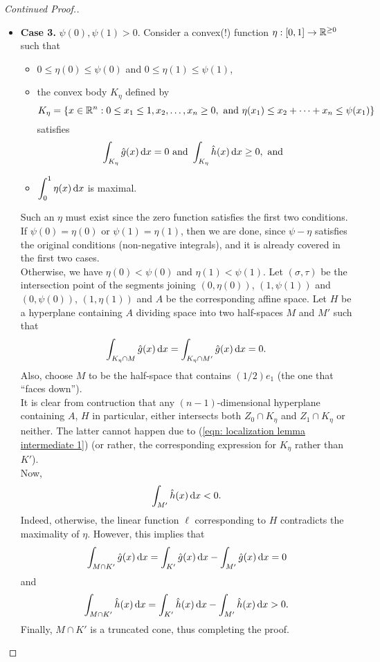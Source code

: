 \begin{proof}[Continued Proof.]
\begin{itemize}
		\item \textbf{Case 3.} $\psi(0),\psi(1)>0$.%
		Consider a convex(!) function $\eta:[0,1]\to\mathbb{R}^{\geq 0}$ such that
		\begin{itemize}
			\item $0\leq\eta(0)\leq\psi(0)$ and $0\leq\eta(1)\leq\psi(1)$,
			\item the convex body $K_\eta$ defined by
			\[ K_\eta = \{ x\in\mathbb{R}^n : 0\leq x_1\leq 1, x_2,\ldots,x_n\geq 0, \text{ and } \eta(x_1)\leq x_2+\cdots+x_n\leq\psi(x_1) \} \]
			satisfies
			\[ \int_{K_\eta} \hat{g}(x)\operatorname{d}\!{x} = 0 \text{ and } \int_{K_\eta} \hat{h}(x)\operatorname{d}\!{x}\geq 0, \text{ and } \]
			\item $\displaystyle\int_0^1 \eta(x)\operatorname{d}\!{x}$ is maximal.
		\end{itemize}
		Such an $\eta$ must exist since the zero function satisfies the first two conditions.\\
		If $\psi(0)=\eta(0)$ or $\psi(1)=\eta(1)$, then we are done, since $\psi-\eta$ satisfies the original conditions (non-negative integrals), and it is already covered in the first two cases.\\
		Otherwise, we have $\eta(0)<\psi(0)$ and $\eta(1)<\psi(1)$. Let $(\sigma,\tau)$ be the intersection point of the segments joining $(0,\eta(0))$, $(1,\psi(1))$ and $(0,\psi(0))$, $(1,\eta(1))$ and $A$ be the corresponding affine space. Let $H$ be a hyperplane containing $A$ dividing space into two half-spaces $M$ and $M'$ such that
		\[ \int_{K_\eta \cap M} \hat{g}(x)\operatorname{d}\!{x} = \int_{K_\eta \cap M'} \hat{g}(x)\operatorname{d}\!{x} = 0.  \]
		Also, choose $M$ to be the half-space that contains $(1/2) e_1$ (the one that ``faces down'').\\
		It is clear from contruction that any $(n-1)$-dimensional hyperplane containing $A$, $H$ in particular, either intersects both $Z_0\cap K_\eta$ and $Z_1\cap K_\eta$ or neither. The latter cannot happen due to (\ref{eqn: localization lemma intermediate 1}) (or rather, the corresponding expression for $K_\eta$ rather than $K'$).\\
		Now,
		\[ \int_{M'} \hat{h}(x)\operatorname{d}\!{x} < 0. \]
		Indeed, otherwise, the linear function $\ell$ corresponding to $H$ contradicts the maximality of $\eta$. However, this implies that
		\[ \int_{M\cap K'} \hat{g}(x)\operatorname{d}\!{x} = \int_{K'} \hat{g}(x)\operatorname{d}\!{x} - \int_{M'}\hat{g}(x)\operatorname{d}\!{x} = 0 \]
		and
		\[ \int_{M\cap K'} \hat{h}(x)\operatorname{d}\!{x} = \int_{K'} \hat{h}(x)\operatorname{d}\!{x} - \int_{M'}\hat{h}(x)\operatorname{d}\!{x} > 0. \]
		Finally, $M\cap K'$ is a truncated cone, thus completing the proof.\qedhere
	\end{itemize}
\end{proof}

